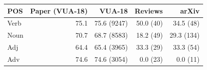 \begin{tabular}{lrrrr}
\toprule
POS & Paper (VUA-18) & VUA-18 & Reviews & arXiv \\
\midrule
Verb & 75.1 & 75.6 (9247) & 50.0 (40) & 34.5 (48) \\
Noun & 70.7 & 68.7 (8583) & 18.2 (49) & 29.3 (134) \\
Adj & 64.4 & 65.4 (3965) & 33.3 (29) & 33.3 (54) \\
Adv & 74.6 & 74.6 (3054) & 0.0 (23) & 0.0 (11) \\
\bottomrule
\end{tabular}
